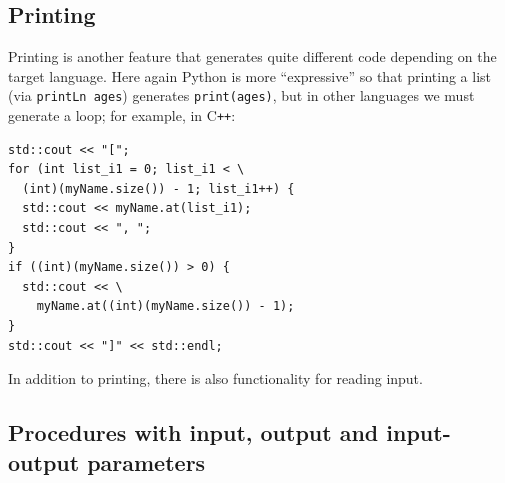 \documentclass[sigplan,review,anonymous,prologue,dvipsnames]{acmart}
\newcommand{\Cplusplus}{C\texttt{++}}
\begin{document}
\subsection{Printing}

Printing is another feature that generates quite
different code depending on the target language.  Here again Python
is more ``expressive'' so that printing a list (via
\verb|printLn ages|) generates \verb|print(ages)|, but in other languages
we must generate a loop; for example, in \Cplusplus:
\begin{lstlisting}
std::cout << "[";
for (int list_i1 = 0; list_i1 < \
  (int)(myName.size()) - 1; list_i1++) {
  std::cout << myName.at(list_i1);
  std::cout << ", ";
}
if ((int)(myName.size()) > 0) {
  std::cout << \
    myName.at((int)(myName.size()) - 1);
}
std::cout << "]" << std::endl;
\end{lstlisting}
In addition to printing, there is also functionality for reading input.

\subsection{Procedures with input, output and input-output parameters}
\end{document}
